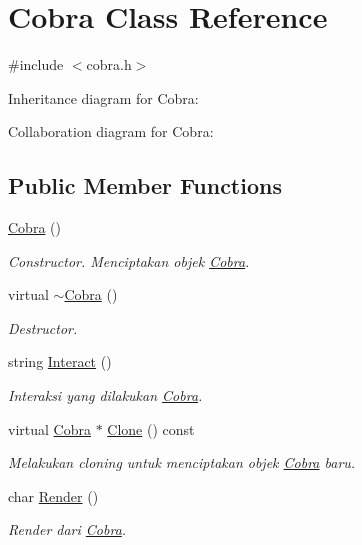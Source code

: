 \hypertarget{classCobra}{}\section{Cobra Class Reference}
\label{classCobra}


{\ttfamily \#include $<$cobra.\+h$>$}



Inheritance diagram for Cobra\+:


Collaboration diagram for Cobra\+:
\subsection*{Public Member Functions}
\begin{DoxyCompactItemize}
\item 
\hyperlink{classCobra_acc0ec4a84ca7a0ea5e53aa1e8cabd268}{Cobra} ()
\begin{DoxyCompactList}\small\item\em Constructor. Menciptakan objek \hyperlink{classCobra}{Cobra}. \end{DoxyCompactList}\item 
virtual \hyperlink{classCobra_ac109599e6a8c9a01e852c54fb6fa2687}{$\sim$\+Cobra} ()
\begin{DoxyCompactList}\small\item\em Destructor. \end{DoxyCompactList}\item 
string \hyperlink{classCobra_aa8dd0878e3d654e51bec9592c88bcab5}{Interact} ()
\begin{DoxyCompactList}\small\item\em Interaksi yang dilakukan \hyperlink{classCobra}{Cobra}. \end{DoxyCompactList}\item 
virtual \hyperlink{classCobra}{Cobra} $\ast$ \hyperlink{classCobra_a1bfd2035a0a700b6362b1853cb12949b}{Clone} () const 
\begin{DoxyCompactList}\small\item\em Melakukan cloning untuk menciptakan objek \hyperlink{classCobra}{Cobra} baru. \end{DoxyCompactList}\item 
char \hyperlink{classCobra_abca7da2ee55ce825dc49f4f9a3e87208}{Render} ()
\begin{DoxyCompactList}\small\item\em Render dari \hyperlink{classCobra}{Cobra}. \end{DoxyCompactList}\end{DoxyCompactItemize}
